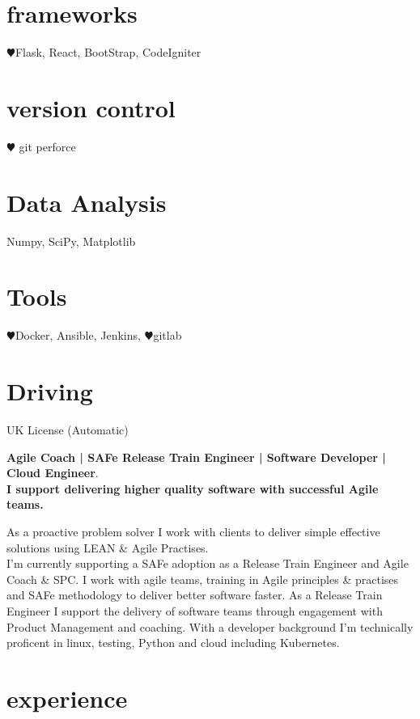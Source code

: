 \documentclass[]{cv-style}          %
\begin{document}
\begin{aside}
\section{frameworks}
{\color{red} $\varheartsuit$}Flask, React, BootStrap, CodeIgniter
\section{version control}
{\color{red} $\varheartsuit$} git perforce
\section{Data Analysis}
Numpy, SciPy, Matplotlib
\section{Tools}
{\color{red} $\varheartsuit$}Docker, Ansible, Jenkins, {\color{red} $\varheartsuit$}gitlab
\section{Driving}UK License (Automatic)
\end{aside}

\textbf{Agile Coach | SAFe Release Train Engineer | Software Developer | Cloud Engineer}.\\\textbf{I support delivering higher quality software with successful Agile teams.}\par
As a proactive problem solver I work with clients to deliver simple effective solutions using LEAN \& Agile Practises.\\
I'm currently supporting a SAFe adoption as a Release Train Engineer and Agile Coach \& SPC.
I work with agile teams, training in Agile principles \& practises and SAFe methodology to deliver better software faster. As a Release Train Engineer I support the delivery of software teams through engagement with Product Management and coaching.
With a developer background I'm technically proficent in linux, testing, Python and cloud including Kubernetes.



\section{experience}
\end{document}
